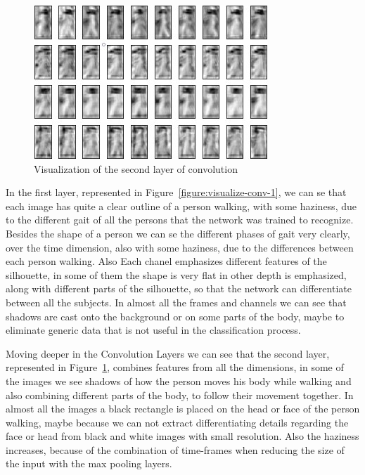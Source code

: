 \documentclass[12pt]{article}
\theoremstyle{definition}
\begin{document}
	\begin{figure}[ht]
		\includegraphics[width=\textwidth]{conv-see/visualization-4.jpg}
		\caption{Visualization of the second layer of convolution}
		\label{figure:visualize-conv-2}
	\end{figure}

	In the first layer, represented in Figure~\ref{figure:visualize-conv-1}, we can se that each image has quite a clear outline of a person walking, with some haziness, due to the different gait of all the persons that the network was trained to recognize. Besides the shape of a person we can se the different phases of gait very clearly, over the time dimension, also with some haziness, due to the differences between each person walking. Also Each chanel emphasizes different features of the silhouette, in some of them the shape is very flat in other depth is emphasized, along with different parts of the silhouette, so that the network can differentiate between all the subjects. In almost all the frames and channels we can see that shadows are cast onto the background or on some parts of the body, maybe to eliminate generic data that is not useful in the classification process.

	Moving deeper in the Convolution Layers we can see that the second layer, represented in Figure~\ref{figure:visualize-conv-2}, combines features from all the dimensions, in some of the images we see shadows of how the person moves his body while walking and also combining different parts of the body, to follow their movement together. In almost all the images a black rectangle is placed on the head or face of the person walking, maybe because we can not extract differentiating details regarding the face or head from black and white images with small resolution. Also the haziness increases, because of the combination of time-frames when reducing the size of the input with the max pooling layers.
\end{document}
